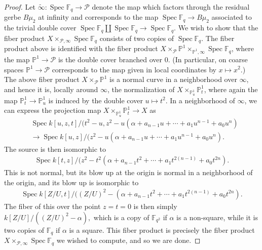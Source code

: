\documentclass[12 pt]{amsart}
\theoremstyle{plain}
\theoremstyle{definition}
\theoremstyle{remark}
\numberwithin{equation}{section}
\DeclareMathOperator\spec{Spec}
\begin{document}
\begin{proof}
Let $\widetilde{\infty} : \spec \mathbb F_q \to \mathscr P$ denote the map which
factors through the residual gerbe $B\mu_2$ at infinity and corresponds to the
map $\spec \mathbb F_q \to B\mu_2$ associated to the trivial double cover $\spec
\mathbb F_q \coprod \spec \mathbb F_q \to \spec \mathbb F_q$.
We wish to show that the fiber product
$X \times_{\mathscr P, \infty} \spec \mathbb F_q$ consists of two copies of
$\spec \mathbb
F_q$.
The fiber product above is identified with the fiber product
$X \times_{\mathscr P} \mathbb P^1 \times_{\mathbb P^1, \infty} \spec \mathbb F_q$, where the
map $\mathbb P^1 \to \mathscr P$ is the double cover branched over $0$. (In
	particular, on
coarse spaces $\mathbb P^1 \to \mathscr P$ corresponds to the map given in local
coordinates by $x \mapsto x^2$.)
The above fiber product $X \times_{\mathscr P} \mathbb P^1$ is a normal curve in
a neighborhood over
$\infty$, and hence
it is, locally around $\infty$, the normalization of 
$X \times_{\mathbb P^1_u} \mathbb P^1_t$, where again the map $\mathbb P^1_t \to
\mathbb P^1_u$ is induced by the double cover $u \mapsto t^2$.
In a neighborhood of $\infty$, we can express the projection map
$X \times_{\mathbb P^1_u} \mathbb P^1_t \to X$ as
\begin{align*}
	&\spec k[u,z,t]/(t^2 - u,z^2 -  u(\alpha + a_{n-1}u + \cdots + a_1u^{n-1} +
a_0u^n) \\
&\to \spec k[u,z]/(z^2 -  u(\alpha + a_{n-1}u + \cdots + a_1u^{n-1} +
a_0u^n).
\end{align*}
The source is then isomorphic to 
\begin{align*}
	\spec k[t,z]/(z^2 -  t^2(\alpha + a_{n-1}t^2 + \cdots + a_1t^{2(n-1)} +
a_0t^{2n}).
\end{align*}
This is not normal, but its blow up at the origin is normal in a
neighborhood of the origin, and its blow up is isomorphic to
\begin{align*}
\spec k[Z/U, t]/( (Z/U)^2 - (\alpha + a_{n-1}t^2 + \cdots + a_1t^{2(n-1)} +
a_0t^{2n}).
\end{align*}
The fiber of this over the point $z = t = 0$ is then simply
$k[Z/U]/( (Z/U)^2 - \alpha),$ which is a copy of $\mathbb F_{q^2}$ if $\alpha$
is a non-square, while it is two copies of $\mathbb F_q$ if $\alpha$ is a
square.
This fiber product is precisely the fiber product
$X \times_{\mathscr P, \infty} \spec \mathbb F_q$ we wished to compute, and so
we are done.
\end{proof}
\end{document}
